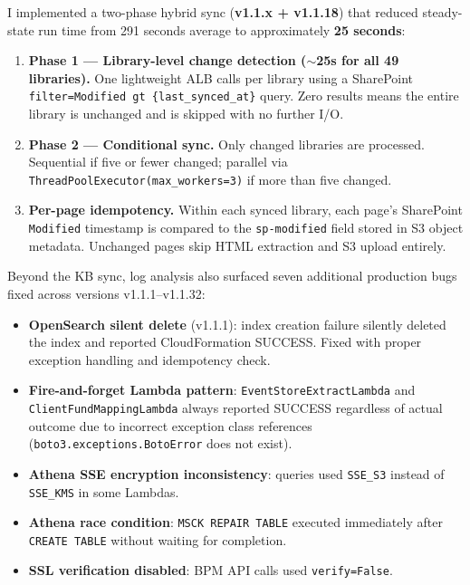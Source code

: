 I implemented a two-phase hybrid sync (\textbf{v1.1.x + v1.1.18}) that
reduced steady-state run time from 291 seconds average to approximately
\textbf{25 seconds}:

\begin{enumerate}
    \item \textbf{Phase 1 --- Library-level change detection ($\sim$25s
          for all 49 libraries).} One lightweight ALB calls per library
          using a SharePoint \texttt{filter=Modified gt \{last\_synced\_at\}}
          query. Zero results means the entire library is unchanged and
          is skipped with no further I/O.
    \item \textbf{Phase 2 --- Conditional sync.} Only changed libraries
          are processed. Sequential if five or fewer changed; parallel
          via \texttt{ThreadPoolExecutor(max\_workers=3)} if more than
          five changed.
    \item \textbf{Per-page idempotency.} Within each synced library,
          each page's SharePoint \texttt{Modified} timestamp is compared
          to the \texttt{sp-modified} field stored in S3 object metadata.
          Unchanged pages skip HTML extraction and S3 upload entirely.
\end{enumerate}

Beyond the KB sync, log analysis also surfaced seven additional
production bugs fixed across versions v1.1.1--v1.1.32:

\begin{itemize}
    \item \textbf{OpenSearch silent delete} (v1.1.1): index creation
          failure silently deleted the index and reported CloudFormation
          SUCCESS. Fixed with proper exception handling and idempotency
          check.
    \item \textbf{Fire-and-forget Lambda pattern}: \texttt{EventStoreExtractLambda}
          and \texttt{ClientFundMappingLambda} always reported SUCCESS
          regardless of actual outcome due to incorrect exception class
          references (\texttt{boto3.exceptions.BotoError} does not exist).
    \item \textbf{Athena SSE encryption inconsistency}: queries used
          \texttt{SSE\_S3} instead of \texttt{SSE\_KMS} in some Lambdas.
    \item \textbf{Athena race condition}: \texttt{MSCK REPAIR TABLE}
          executed immediately after \texttt{CREATE TABLE} without
          waiting for completion.
    \item \textbf{SSL verification disabled}: BPM API calls used
          \texttt{verify=False}.
\end{itemize}

